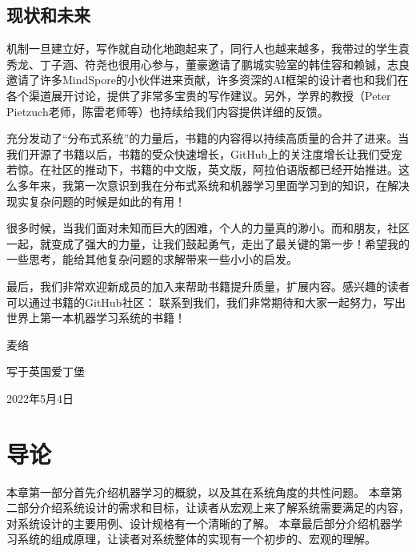 \documentclass[letterpaper,10pt,english]{sphinxmanual}
\begin{document}
\section{现状和未来}
\label{\detokenize{chapter_preface/index:id5}}
\sphinxAtStartPar
机制一旦建立好，写作就自动化地跑起来了，同行人也越来越多，我带过的学生袁秀龙、丁子涵、符尧也很用心参与，董豪邀请了鹏城实验室的韩佳容和赖铖，志良邀请了许多MindSpore的小伙伴进来贡献，许多资深的AI框架的设计者也和我们在各个渠道展开讨论，提供了非常多宝贵的写作建议。另外，学界的教授（Peter
Pietzuch老师，陈雷老师等）也持续给我们内容提供详细的反馈。

\sphinxAtStartPar
充分发动了“分布式系统”的力量后，书籍的内容得以持续高质量的合并了进来。当我们开源了书籍以后，书籍的受众快速增长，GitHub上的关注度增长让我们受宠若惊。在社区的推动下，书籍的中文版，英文版，阿拉伯语版都已经开始推进。这么多年来，我第一次意识到我在分布式系统和机器学习里面学习到的知识，在解决现实复杂问题的时候是如此的有用！

\sphinxAtStartPar
很多时候，当我们面对未知而巨大的困难，个人的力量真的渺小。而和朋友，社区一起，就变成了强大的力量，让我们鼓起勇气，走出了最关键的第一步！希望我的一些思考，能给其他复杂问题的求解带来一些小小的启发。

\sphinxAtStartPar
最后，我们非常欢迎新成员的加入来帮助书籍提升质量，扩展内容。感兴趣的读者可以通过书籍的GitHub社区：
联系到我们，我们非常期待和大家一起努力，写出世界上第一本机器学习系统的书籍！

\sphinxAtStartPar
麦络

\sphinxAtStartPar
写于英国爱丁堡

\sphinxAtStartPar
2022年5月4日


\chapter{导论}
\label{\detokenize{chapter_introduction/index:id1}}\label{\detokenize{chapter_introduction/index::doc}}
\sphinxAtStartPar
本章第一部分首先介绍机器学习的概貌，以及其在系统角度的共性问题。
本章第二部分介绍系统设计的需求和目标，让读者从宏观上来了解系统需要满足的内容，对系统设计的主要用例、设计规格有一个清晰的了解。
本章最后部分介绍机器学习系统的组成原理，让读者对系统整体的实现有一个初步的、宏观的理解。
\end{document}
